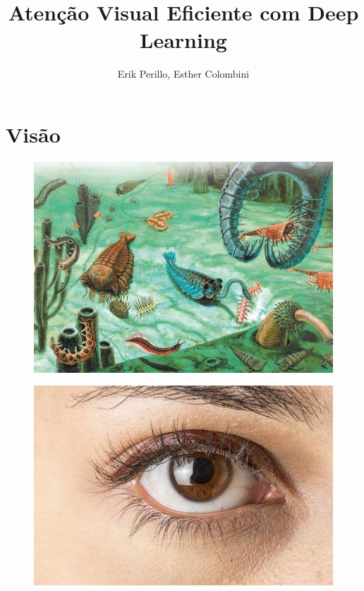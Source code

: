 \documentclass[10pt]{beamer}
\title{Atenção Visual Eficiente com Deep Learning}
\subtitle{}
\author{Erik Perillo, Esther Colombini}
\date{}
\institute{Instituto de Computação -- Unicamp}
\begin{document}
\maketitle

\section{Visão}

\begin{frame}{}
    \begin{figure}
        \centering
        \includegraphics[width=1.0\linewidth]{./img/precambrian}
    \end{figure}
\end{frame}

\begin{frame}{}
    \begin{figure}
        \centering
        \includegraphics[width=1.0\linewidth]{./img/eye.jpg}
    \end{figure}
\end{frame}
\end{document}
